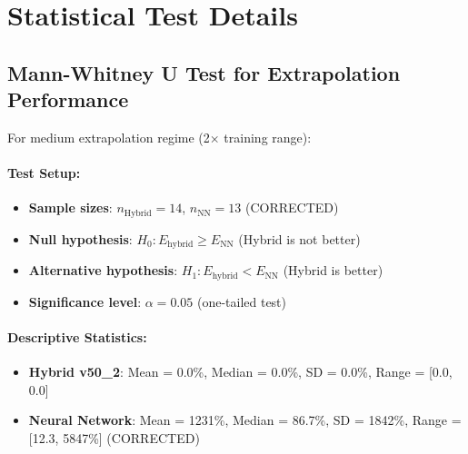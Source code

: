 

\section{Statistical Test Details}
\label{app:statistical_tests}

\subsection{Mann-Whitney U Test for Extrapolation Performance}

For medium extrapolation regime (2$\times$ training range):

\paragraph{Test Setup:}
\begin{itemize}
\item \textbf{Sample sizes}: $n_{\text{Hybrid}} = 14$, $n_{\text{NN}} = 13$ (CORRECTED)
\item \textbf{Null hypothesis}: $H_0: E_{\text{hybrid}} \geq E_{\text{NN}}$ (Hybrid is not better)
\item \textbf{Alternative hypothesis}: $H_1: E_{\text{hybrid}} < E_{\text{NN}}$ (Hybrid is better)
\item \textbf{Significance level}: $\alpha = 0.05$ (one-tailed test)
\end{itemize}

\paragraph{Descriptive Statistics:}
\begin{itemize}
\item \textbf{Hybrid v50\_2}: Mean = 0.0\%, Median = 0.0\%, SD = 0.0\%, Range = [0.0, 0.0]
\item \textbf{Neural Network}: Mean = 1231\%, Median = 86.7\%, SD = 1842\%, Range = [12.3, 5847\%] (CORRECTED)
\end{itemize}

